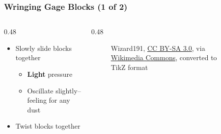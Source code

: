 \begin{frame}
	\frametitle{Wringing Gage Blocks (1 of 2)}

    \begin{columns}
        \begin{column}{0.48\linewidth}
            \begin{itemize}[<+- | alert@+>]
                \item[1.] Slowly slide blocks together
                    \begin{itemize}
                        \item \textbf{Light} pressure
                        \item Oscillate slightly--feeling for any dust
                    \end{itemize}
                \item[2.] Twist blocks together
            \end{itemize}
        \end{column}
        \begin{column}{0.48\linewidth}
            \begin{figure}
                \centering
                \resizebox{\linewidth}{!}{
                    
                }

                \vspace{0.5em}
                {\tiny Wizard191, \href{http://creativecommons.org/licenses/by-sa/3.0/}{CC BY-SA 3.0}, via \href{https://commons.wikimedia.org/wiki/File:Gauge_block_wringing.svg}{Wikimedia Commons}, converted to TikZ format\par}
            \end{figure}
        \end{column}
    \end{columns}
\end{frame}


